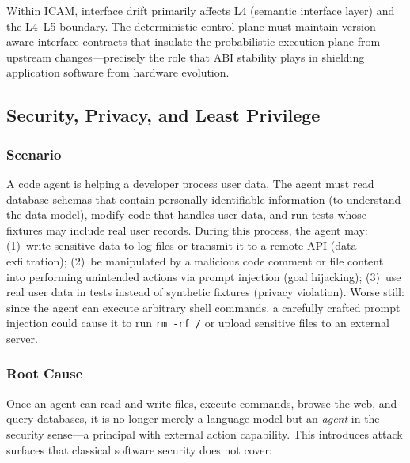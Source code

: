 \documentclass[11pt,a4paper]{article}
\begin{document}
Within ICAM, interface drift primarily affects L4 (semantic interface layer) and the L4--L5 boundary.
The deterministic control plane must maintain version-aware interface contracts that insulate the probabilistic execution plane from upstream changes---precisely the role that ABI stability plays in shielding application software from hardware evolution.


\subsection{Security, Privacy, and Least Privilege}

\subsubsection{Scenario}
A code agent is helping a developer process user data.
The agent must read database schemas that contain personally identifiable information (to understand the data model), modify code that handles user data, and run tests whose fixtures may include real user records.
During this process, the agent may: (1)~write sensitive data to log files or transmit it to a remote API (data exfiltration); (2)~be manipulated by a malicious code comment or file content into performing unintended actions via prompt injection (goal hijacking); (3)~use real user data in tests instead of synthetic fixtures (privacy violation).
Worse still: since the agent can execute arbitrary shell commands, a carefully crafted prompt injection could cause it to run \texttt{rm -rf /} or upload sensitive files to an external server.

\subsubsection{Root Cause}
Once an agent can read and write files, execute commands, browse the web, and query databases, it is no longer merely a language model but an \emph{agent} in the security sense---a principal with external action capability.
This introduces attack surfaces that classical software security does not cover:
\end{document}
